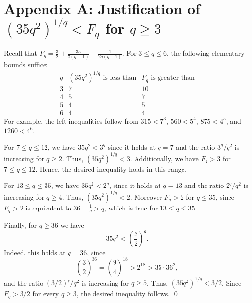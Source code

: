 \documentclass[11pt]{article}
\theoremstyle{remark}
\begin{document}
\section*{Appendix A: Justification of~$(35q^2)^{1/q}<F_q$ for $q\ge 3 $}\label{app:ineq-proof}
Recall that $F_q=\frac32+\frac{35}{2(q-1)}-\frac{1}{2q(q-1)}$.
For $3\le q\le 6$, the following elementary bounds suffice:
\[
    \begin{array}{c|c|c}
        q & (35q^2)^{1/q}\text{ is less than} & F_q\text{ is greater than} \\ \hline
        3 & 7                                 & 10                         \\
        4 & 5                                 & 7                          \\
        5 & 4                                 & 5                          \\
        6 & 4                                 & 4
    \end{array}
\]
For example, the left inequalities follow from
$315<7^3$, $560<5^4$, $875<4^5$, and $1260<4^6$.

For $7\le q\le 12$, we have $35q^2<3^q$ since it holds at $q=7$ and the ratio $3^q/q^2$ is increasing for $q\ge 2$.
Thus, $(35q^2)^{1/q}<3$.
Additionally, we have $F_q>3$
for $7\le q\le 12$.
Hence, the desired inequality holds in this range.

For $13\le q\le 35$, we have $35q^2<2^q$, since it holds at $q=13$ and the ratio $2^q/q^2$ is increasing for $q\ge 4$.
Thus, $(35q^2)^{1/q}<2$.
Moreover $F_q>2$ for $q\le 35$, since $F_q>2$ is equivalent to $36-\frac1q>q$, which is true for $13\le q\le 35$.

Finally, for $q\ge 36$ we have
\[
    35q^2<\left(\frac32\right)^q.
\]
Indeed, this holds at $q=36$, since
\[
    \left(\frac32\right)^{36}=\left(\frac94\right)^{18}>2^{18}>35\cdot 36^2,
\]
and the ratio $(3/2)^q/q^2$ is increasing for $q\ge 5$.
Thus, $(35q^2)^{1/q}<3/2$.  Since $F_q>3/2$ for every $q\ge 3$, the desired inequality follows.
\qed
\end{document}
